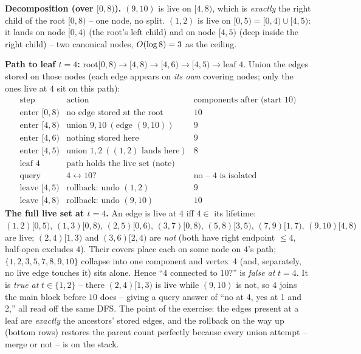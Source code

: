 \begin{tracebox}[Cover of \([4,8)\) and \([0,5)\); then the root-to-leaf-4 rollback path]
\textbf{Decomposition (over \([0,8)\)).}  \((9,10)\) is live on \([4,8)\), which
is \emph{exactly} the right child of the root \([0,8)\) -- one node, no split.
\((1,2)\) is live on \([0,5)=[0,4)\cup[4,5)\): it lands on node \([0,4)\) (the
root's left child) and on node \([4,5)\) (deep inside the right child) -- two
canonical nodes, \(O(\log 8)=3\) as the ceiling.

\textbf{Path to leaf \(t=4\):} root\([0,8)\!\to\![4,8)\!\to\![4,6)\!\to\![4,5)\!\to\!
\text{leaf }4\).  Union the edges stored on those nodes (each edge appears on
\emph{its own} covering nodes; only the ones live at \(4\) sit on this path):
\[
\renewcommand{\arraystretch}{1.15}
\begin{array}{l|l|l}
\text{step} & \text{action} & \text{components after (start }10)\\\hline
\text{enter }[0,8) & \text{no edge stored at the root} & 10\\
\text{enter }[4,8) & \text{union }9,10\ (\text{edge }(9,10)) & 9\\
\text{enter }[4,6) & \text{nothing stored here} & 9\\
\text{enter }[4,5) & \text{union }1,2\ ((1,2)\text{ lands here}) & 8\\
\text{leaf }4 & \text{path holds the live set (note)} & \\
\text{query} & 4\leftrightarrow10? & \text{no -- }4\text{ is isolated}\\
\text{leave }[4,5) & \text{rollback: undo }(1,2) & 9\\
\text{leave }[4,8) & \text{rollback: undo }(9,10) & 10
\end{array}
\]
\textbf{The full live set at \(t=4\).}  An edge is live at \(4\) iff \(4\in\) its
lifetime: \((1,2)[0,5),\,(1,3)[0,8),\,(2,5)[0,6),\,(3,7)[0,8),\,(5,8)[3,5),\,
(7,9)[1,7),\,(9,10)[4,8)\) are live; \((2,4)[1,3)\) and \((3,6)[2,4)\) are
\emph{not} (both have right endpoint \(\le4\), half-open excludes \(4\)).  Their
covers place each on some node on \(4\)'s path; \(\{1,2,3,5,7,8,9,10\}\) collapse
into one component and vertex~4 (and, separately, no live edge touches it) sits
alone.  Hence ``\(4\) connected to \(10\)?'' is \emph{false at }\(t=4\).  It is
\emph{true at }\(t\in\{1,2\}\) -- there \((2,4)[1,3)\) is live while \((9,10)\)
is not, so \(4\) joins the main block before \(10\) does -- giving a query
answer of ``no at 4, yes at 1 and 2,'' all read off the same DFS.  The point of
the exercise: the edges present at a leaf are \emph{exactly} the ancestors'
stored edges, and the rollback on the way up (bottom rows) restores the parent
count perfectly because every union attempt -- merge or not -- is on the stack.
\end{tracebox}

